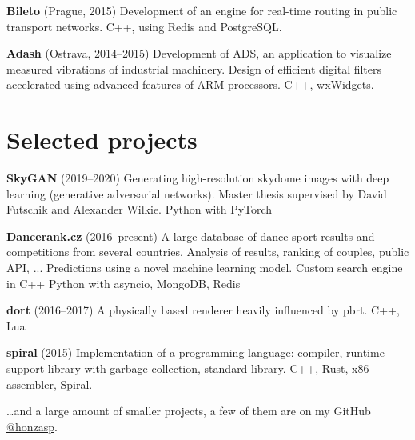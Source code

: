 \documentclass[11pt,a4paper]{article}
\begin{document}
\begin{multicols}{2}
\textbf{Bileto} (Prague, 2015)
  \newline Development of an engine for real-time routing in public transport
    networks.
  \newline C++, using Redis and PostgreSQL.

\textbf{Adash} (Ostrava, 2014–2015)
  \newline Development of ADS, an application to visualize measured vibrations
  of industrial machinery.
  \newline Design of efficient digital filters accelerated using advanced
  features of ARM processors.
  \newline C++, wxWidgets.


\section*{Selected projects}

\textbf{SkyGAN} (2019–2020)
  \newline Generating high-resolution skydome images with deep learning
  (generative adversarial networks).
  \newline Master thesis supervised by David Futschik and Alexander Wilkie.
  \newline Python with PyTorch

\textbf{Dancerank.cz} (2016–present)
  \newline A large database of dance sport results and competitions from several
  countries.
  \newline Analysis of results, ranking of couples, public API, ...
  \newline Predictions using a novel machine learning model.
  \newline Custom search engine in C++
  \newline Python with asyncio, MongoDB, Redis

\textbf{dort} (2016–2017)
  \newline A physically based renderer heavily influenced by pbrt.
  \newline C++, Lua

\textbf{spiral} (2015)
  \newline Implementation of a programming language: compiler, runtime support
  library with garbage collection, standard library.
  \newline C++, Rust, x86 assembler, Spiral.

\ldots{}and a large amount of smaller projects, a few of them are on my GitHub 
\href{https://github.com/honzasp}{@honzasp}.


\end{multicols}
\end{document}
